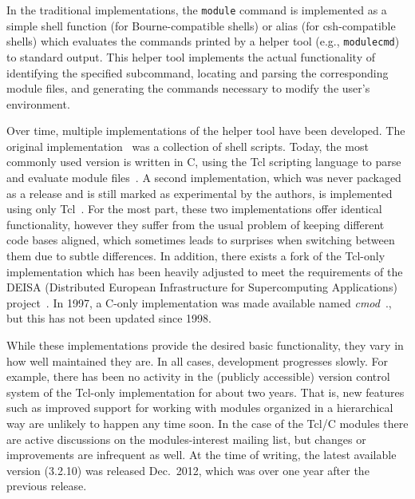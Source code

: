 %

In the traditional implementations, the \texttt{\small module} command
is implemented as a simple shell function (for Bourne-compatible shells) or
alias (for csh-compatible shells) which evaluates the commands printed by a
helper tool (e.g., \texttt{\small modulecmd}) to standard output. This helper tool
implements the actual functionality of identifying the specified subcommand,
locating and parsing the corresponding module files, and generating the
commands necessary to modify the user's environment.

Over time, multiple implementations of the helper tool
have been developed. The original implementation~\cite{furlani91} was a collection
of shell scripts. Today, the most commonly used version is written in C, using
the Tcl scripting language to parse and evaluate module files~\cite{em}. A second
implementation, which was never packaged as a release and is still marked as
experimental by the authors, is implemented using only Tcl~\cite{em}. For the most
part, these two implementations
offer identical functionality, however they suffer from the usual
problem of keeping different code bases aligned, which sometimes leads
to surprises when switching between them due to subtle differences. In addition,
there exists a
fork of the Tcl-only implementation which has been heavily adjusted to meet
the requirements of the DEISA (Distributed European Infrastructure for
Supercomputing Applications) project~\cite{wikiDEISA}.  In
1997, a C-only implementation was made
available named \emph{cmod}~\cite{cmod}., but this has not been updated since 1998.



While these implementations provide the desired basic functionality, they
vary in how well maintained they are. In all cases, development
progresses slowly. For example, there has been no activity in the
(publicly accessible) version control system of the Tcl-only
implementation for about two years. That is, new features such as
improved support for working with modules organized in a hierarchical way are
unlikely to happen any time soon. In the case of the Tcl/C modules
there are active discussions on the modules-interest mailing list, but
changes or improvements are infrequent as well. At the time of writing, the
latest available version (3.2.10) was released Dec.~2012, which was over one year
after the previous release.

